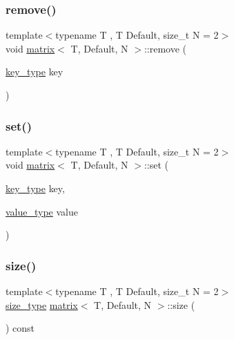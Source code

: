 \subsubsection{\texorpdfstring{remove()}{remove()}}
{\footnotesize\ttfamily template$<$typename T , T Default, size\+\_\+t N = 2$>$ \\
void \hyperlink{structmatrix}{matrix}$<$ T, Default, N $>$\+::remove (\begin{DoxyParamCaption}\item[{\hyperlink{structmatrix_ae7906bda02f5d7f6744d9545c9465e13}{key\+\_\+type}}]{key }\end{DoxyParamCaption})\hspace{0.3cm}{\ttfamily [inline]}}

\mbox{\label{structmatrix_aaeb0f5223d18966172e12cdf35a8edb0}} 
\subsubsection{\texorpdfstring{set()}{set()}}
{\footnotesize\ttfamily template$<$typename T , T Default, size\+\_\+t N = 2$>$ \\
void \hyperlink{structmatrix}{matrix}$<$ T, Default, N $>$\+::set (\begin{DoxyParamCaption}\item[{\hyperlink{structmatrix_ae7906bda02f5d7f6744d9545c9465e13}{key\+\_\+type}}]{key,  }\item[{\hyperlink{structmatrix_aeb660563444929ee10d8a0b06d42a951}{value\+\_\+type}}]{value }\end{DoxyParamCaption})\hspace{0.3cm}{\ttfamily [inline]}}

\mbox{\label{structmatrix_abbe65fbc728f4958ad972a16d94716af}} 
\subsubsection{\texorpdfstring{size()}{size()}}
{\footnotesize\ttfamily template$<$typename T , T Default, size\+\_\+t N = 2$>$ \\
\hyperlink{structmatrix_a1a99bcb39d34cb8acd10a5d1a260542b}{size\+\_\+type} \hyperlink{structmatrix}{matrix}$<$ T, Default, N $>$\+::size (\begin{DoxyParamCaption}{ }\end{DoxyParamCaption}) const\hspace{0.3cm}{\ttfamily [inline]}}



